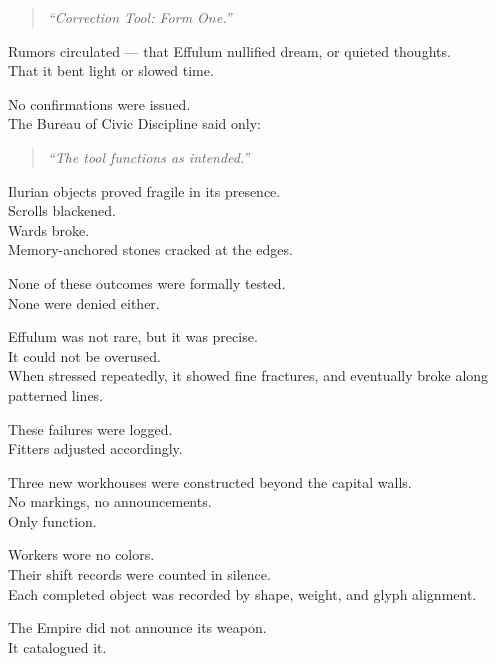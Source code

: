 \documentclass[9pt]{article}
\begin{document}
\begin{quote}
\textit{“Correction Tool: Form One.”}
\end{quote}

\vspace{1em}

Rumors circulated — that Effulum nullified dream, or quieted thoughts.\\
That it bent light or slowed time.

No confirmations were issued.\\
The Bureau of Civic Discipline said only:

\begin{quote}
\textit{“The tool functions as intended.”}
\end{quote}

\vspace{1em}

Ilurian objects proved fragile in its presence.\\
Scrolls blackened.\\
Wards broke.\\
Memory-anchored stones cracked at the edges.

None of these outcomes were formally tested.\\
None were denied either.

\vspace{1em}

Effulum was not rare, but it was precise.\\
It could not be overused.\\
When stressed repeatedly, it showed fine fractures, and eventually broke along patterned lines.

These failures were logged.\\
Fitters adjusted accordingly.

\vspace{1em}

Three new workhouses were constructed beyond the capital walls.\\
No markings, no announcements.\\
Only function.

Workers wore no colors.\\
Their shift records were counted in silence.\\
Each completed object was recorded by shape, weight, and glyph alignment.

\vspace{1em}

The Empire did not announce its weapon.\\
It catalogued it.
\end{document}
